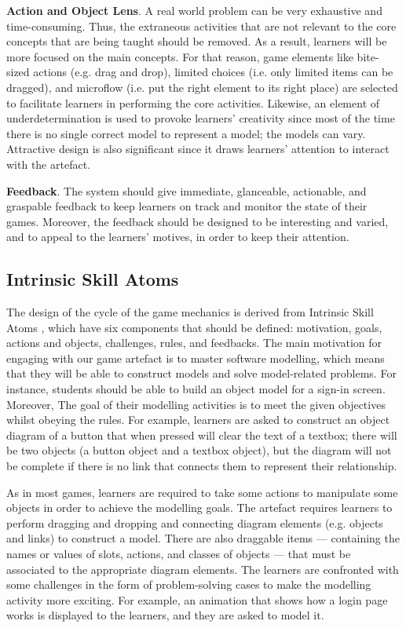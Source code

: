 \documentclass[runningheads,a4paper]{llncs}
\begin{document}
\textbf{Action and Object Lens}. A real world problem can be very exhaustive and time-consuming. Thus, the extraneous activities that are not relevant to the core concepts that are being taught should be removed. As a result, learners will be more focused on the main concepts. For that reason, game elements like bite-sized actions (e.g. drag and drop), limited choices (i.e. only limited items can be dragged), and microflow (i.e. put the right element to its right place) are selected to facilitate learners in performing the core activities. Likewise, an element of underdetermination is used to provoke learners' creativity since most of the time there is no single correct model to represent a model; the models can vary. Attractive design is also significant since it draws learners' attention to interact with the artefact.

\textbf{Feedback}. The system should give immediate, glanceable, actionable, and graspable feedback to keep learners on track and monitor the state of their games. Moreover, the feedback should be designed to be interesting and varied, and to appeal to the learners' motives, in order to keep their attention. 

\subsection{Intrinsic Skill Atoms}
The design of the cycle of the game mechanics is derived from Intrinsic Skill Atoms \cite{deterding2015lens}, which have six components that should be defined: motivation, goals, actions and objects, challenges, rules, and feedbacks. The main motivation for engaging with our game artefact is to master software modelling, which means that they will be able to construct models and solve model-related problems. For instance, students should be able to build an object model for a sign-in screen. Moreover, The goal of their modelling activities is to meet the given objectives whilst obeying the rules. For example, learners are asked to construct an object diagram of a button that when pressed will clear the text of a textbox; there will be two objects (a button object and a textbox object), but the diagram will not be complete if there is no link that connects them to represent their relationship. 

As in most games, learners are required to take some actions to manipulate some objects in order to achieve the modelling goals. The artefact requires learners to perform dragging and dropping and connecting diagram elements (e.g. objects and links) to construct a model. There are also draggable items --- containing the names or values of slots, actions, and classes of objects --- that must be associated to the appropriate diagram elements. The learners are confronted with some challenges in the form of problem-solving cases to make the modelling activity more exciting. For example, an animation that shows how a login page works is displayed to the learners, and they are asked to model it. 
\end{document}
